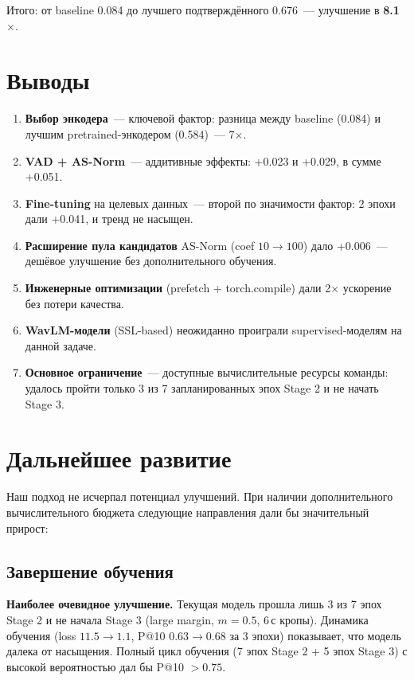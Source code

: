 \documentclass[12pt,a4paper]{article}
\begin{document}
\bigskip
Итого: от baseline 0.084 до лучшего подтверждённого 0.676~--- улучшение в \textbf{8.1$\times$}.

\section{Выводы}

\begin{enumerate}
  \item \textbf{Выбор энкодера}~--- ключевой фактор: разница между baseline (0.084) и лучшим pretrained-энкодером (0.584)~--- 7$\times$.
  \item \textbf{VAD + AS-Norm}~--- аддитивные эффекты: +0.023 и +0.029, в сумме +0.051.
  \item \textbf{Fine-tuning} на целевых данных~--- второй по значимости фактор: 2 эпохи дали +0.041, и тренд не насыщен.
  \item \textbf{Расширение пула кандидатов} AS-Norm (coef $10 \rightarrow 100$) дало +0.006~--- дешёвое улучшение без дополнительного обучения.
  \item \textbf{Инженерные оптимизации} (prefetch + torch.compile) дали 2$\times$ ускорение без потери качества.
  \item \textbf{WavLM-модели} (SSL-based) неожиданно проиграли supervised-моделям на данной задаче.
  \item \textbf{Основное ограничение}~--- доступные вычислительные ресурсы команды: удалось пройти только 3 из 7 запланированных эпох Stage 2 и не начать Stage 3.
\end{enumerate}

\section{Дальнейшее развитие}

Наш подход не исчерпал потенциал улучшений. При наличии дополнительного вычислительного бюджета следующие направления дали бы значительный прирост:

\subsection{Завершение обучения}

\textbf{Наиболее очевидное улучшение.} Текущая модель прошла лишь 3 из 7 эпох Stage 2 и не начала Stage 3 (large margin, $m=0.5$, 6\,с кропы). Динамика обучения (loss $11.5 \rightarrow 1.1$, P@10 $0.63 \rightarrow 0.68$ за 3 эпохи) показывает, что модель далека от насыщения. Полный цикл обучения (7 эпох Stage 2 + 5 эпох Stage 3) с высокой вероятностью дал бы P@10 $> 0.75$.
\end{document}
